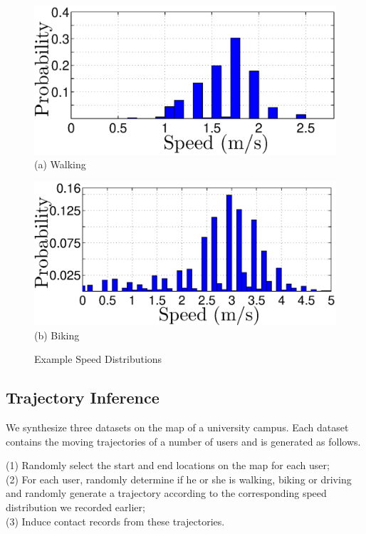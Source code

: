 \begin{figure}
\begin{minipage}[th]{0.48\columnwidth}
\centering
\includegraphics[scale=0.25]{ed_walk.eps}
{\small(a) Walking}

\end{minipage}
\begin{minipage}[th]{0.48\columnwidth}
\centering
\includegraphics[scale=0.25]{bike_youer.eps}
{\small(b) Biking}
\end{minipage}
\caption{Example Speed Distributions}
\label{fig:dist}
\end{figure}


\subsection{Trajectory Inference}
We synthesize three datasets on the map of a university campus. Each
dataset contains the moving trajectories of a number of users and 
is generated as follows.

\noindent(1) Randomly select the start and end locations on 
the map for each user;\\ 
(2) For each user, randomly determine if he or she is walking,
biking or driving and randomly generate a trajectory according to the 
corresponding speed distribution we recorded earlier;\\
(3) Induce contact records from these trajectories.


